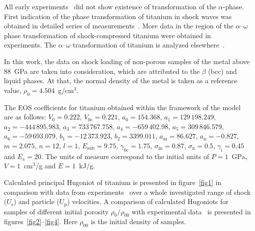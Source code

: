 \documentclass[a4paper]{jpconf}
\begin{document}
All early experiments~\cite{Walsh-Rice-McQueen-Yarger-PR-1957, McQueen-Marsh-JAP-1960, Krupnikov-Bakanova-Brazhnik-Trunin-DAN-1963, Isbell-Shipman-Jones-1968} did not show existence of transformation of the $\alpha$-phase. First indication of the phase transformation of titanium in shock waves was obtained in detailed series of measurements~\cite{McQueen-Marsh-Taylor-Fritz-Carter-1970-proc, LASL-1980}. More data in the region of the $\alpha$--$\omega$ phase transformation of shock-compressed titanium were obtained in experiments\cite{Altshuler-Bakanova-Dudoladov-Dynin-Trunin-Chekin-1981}. The $\alpha$--$\omega$ transformation of titanium is analyzed elsewhere~\cite{Greeff-Trinkle-Albers-Ti-2001}.

In this work, the data on shock loading of non-porous samples of the metal above 88~GPa are taken into consideration, which are attributed to the $\beta$ (bcc) and liquid phases. At that, the normal density of the metal is taken as a reference value, $\rho_0=4.504$~g/cm$^3$.

The EOS coefficients for titanium obtained within the framework of the model are as follows:
$V_0 = 0.222$,
$V_\mathrm{0c} = 0.221$,
$a_0 = 154.368$,
$a_1 = 129\,198.249$,
$a_2 =-444\,895.983$,
$a_3 = 733\,767.758$,
$a_4 =-659\,402.98$,
$a_5 = 309\,846.579$,
$a_6 =-59\,693.079$,
$b_1 =-12\,373.923$,
$b_2 = 3399.011$,
$a_\mathrm{m} = 86.627$,
$a_\mathrm{n} =-0.827$,
$m = 2.075$,
$n = 12$,
$l = 1$,
$E_\mathrm{sub} = 9.75$,
$\gamma_\mathrm{0c} = 1.75$,
$\sigma_\mathrm{m} = 0.87$,
$\sigma_\mathrm{n} = 0.5$,
$\gamma_\mathrm{i} = 0.45$ and
$E_\mathrm{a} = 20$.
The units of measure correspond to the initial units of $P = 1$~GPa, $V = 1$~cm$^3$/g and $E = 1$~kJ/g.

Calculated principal Hugoniot of titanium is presented in figure~\ref{fig1} in comparison with data from experiments~\cite{Walsh-Rice-McQueen-Yarger-PR-1957, McQueen-Marsh-JAP-1960, Krupnikov-Bakanova-Brazhnik-Trunin-DAN-1963, Isbell-Shipman-Jones-1968, LASL-1980, Altshuler-Bakanova-Dudoladov-Dynin-Trunin-Chekin-1981, Trunin-Panov-Medvedev-JETP-Lett-1995, Trunin-Simakov-Medvedev-HT-1999, Trunin-1994-eng, Trunin-Ilkaeva-Podurets-Popov-Pechenkin-Prokhorov-Sevastyanov-Khrustalev-HT-1994} over a whole investigated range of shock ($U_\mathrm{s}$) and particle ($U_\mathrm{p}$) velocities.
%
A comparison of calculated Hugoniots for samples of different initial porosity $\rho_0/\rho_{00}$ with experimental data~\cite{Walsh-Rice-McQueen-Yarger-PR-1957, McQueen-Marsh-JAP-1960, Krupnikov-Bakanova-Brazhnik-Trunin-DAN-1963, Isbell-Shipman-Jones-1968, LASL-1980, Altshuler-Bakanova-Dudoladov-Dynin-Trunin-Chekin-1981, Trunin-Panov-Medvedev-JETP-Lett-1995, Trunin-Simakov-Medvedev-HT-1999, Trunin-1994-eng, Trunin-Ilkaeva-Podurets-Popov-Pechenkin-Prokhorov-Sevastyanov-Khrustalev-HT-1994} is presented in figures~\ref{fig2}--\ref{fig4}. Here $\rho_{00}$ is the initial density of samples.
\end{document}
